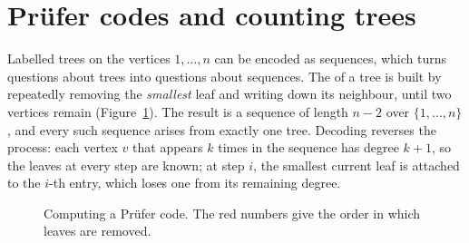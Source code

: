 \section[Prüfer codes]{Prüfer codes and counting trees \hfill \ioi}\label{sec:prufer}

Labelled trees on the vertices $1, \ldots, n$ can be encoded as sequences, which turns questions about trees into questions
about sequences. The  of a tree is built by repeatedly removing the \emph{smallest} leaf and writing down its
neighbour, until two vertices remain (Figure~\ref{fig:prufer}). The result is a sequence of length $n - 2$ over
$\{1, \ldots, n\}$, and every such sequence arises from exactly one tree. Decoding reverses the process: each vertex $v$ that
appears $k$ times in the sequence has degree $k + 1$, so the leaves at every step are known; at step $i$, the smallest current
leaf is attached to the $i$-th entry, which loses one from its remaining degree.

\begin{figure}[htbp]
\centering
{}
\caption{Computing a Prüfer code. The red numbers give the order in which leaves are removed.}
\label{fig:prufer}
\end{figure}

